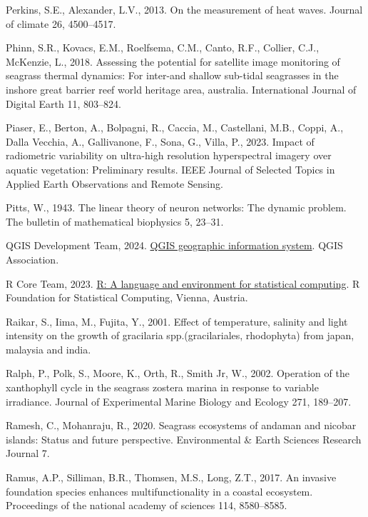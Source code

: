 \documentclass[
  letterpaper,
  11pt,
  english,
  singlespacing,
  headsepline]{MastersDoctoralThesis}
\newlength{\cslhangindent}
\newenvironment{CSLReferences}[2] %
 {\begin{list}{}{%
  \setlength{\itemindent}{0pt}
  \setlength{\leftmargin}{0pt}
  \setlength{\parsep}{0pt}
  \ifodd #1
   \setlength{\leftmargin}{\cslhangindent}
   \setlength{\itemindent}{-1\cslhangindent}
  \fi
  \setlength{\itemsep}{#2\baselineskip}}}
 {\end{list}}
\begin{document}
\begin{CSLReferences}{1}{0}
Perkins, S.E., Alexander, L.V., 2013. On the measurement of heat waves.
Journal of climate 26, 4500--4517.

Phinn, S.R., Kovacs, E.M., Roelfsema, C.M., Canto, R.F., Collier, C.J.,
McKenzie, L., 2018. Assessing the potential for satellite image
monitoring of seagrass thermal dynamics: For inter-and shallow sub-tidal
seagrasses in the inshore great barrier reef world heritage area,
australia. International Journal of Digital Earth 11, 803--824.

Piaser, E., Berton, A., Bolpagni, R., Caccia, M., Castellani, M.B.,
Coppi, A., Dalla Vecchia, A., Gallivanone, F., Sona, G., Villa, P.,
2023. Impact of radiometric variability on ultra-high resolution
hyperspectral imagery over aquatic vegetation: Preliminary results. IEEE
Journal of Selected Topics in Applied Earth Observations and Remote
Sensing.

Pitts, W., 1943. The linear theory of neuron networks: The dynamic
problem. The bulletin of mathematical biophysics 5, 23--31.

QGIS Development Team, 2024. \href{https://www.qgis.org}{QGIS geographic
information system}. QGIS Association.

R Core Team, 2023. \href{https://www.R-project.org/}{R: A language and
environment for statistical computing}. R Foundation for Statistical
Computing, Vienna, Austria.

Raikar, S., Iima, M., Fujita, Y., 2001. Effect of temperature, salinity
and light intensity on the growth of gracilaria spp.(gracilariales,
rhodophyta) from japan, malaysia and india.

Ralph, P., Polk, S., Moore, K., Orth, R., Smith Jr, W., 2002. Operation
of the xanthophyll cycle in the seagrass zostera marina in response to
variable irradiance. Journal of Experimental Marine Biology and Ecology
271, 189--207.

Ramesh, C., Mohanraju, R., 2020. Seagrass ecosystems of andaman and
nicobar islands: Status and future perspective. Environmental \& Earth
Sciences Research Journal 7.

Ramus, A.P., Silliman, B.R., Thomsen, M.S., Long, Z.T., 2017. An
invasive foundation species enhances multifunctionality in a coastal
ecosystem. Proceedings of the national academy of sciences 114,
8580--8585.


\end{CSLReferences}
\end{document}
